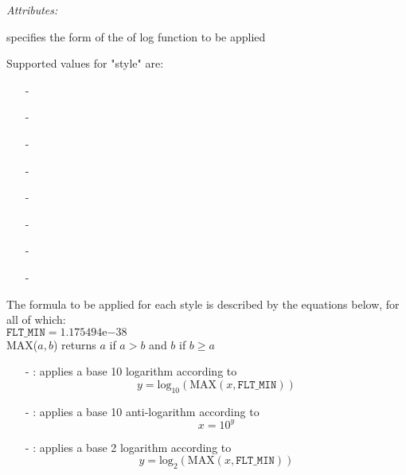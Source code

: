 \emph{Attributes:}
\begin{xmlfields}
    \xmlitem[style][required] specifies the form of the of log function to be applied \par
    Supported values for "style" are: 
        \begin{itemize}
            \item[-] 
            \item[-] 
            \item[-] 
            \item[-] 
            \item[-] 
            \item[-] 
            \item[-] 
            \item[-] 
        \end{itemize}
            
    The formula to be applied for each style is described by the equations below, for all of which: \\[6pt]
        \tabto{0.75in} $\texttt{FLT\_MIN} = 1.175494\mathrm{e}{-38}$\\[6pt]
        \tabto{0.75in} MAX(${a,b}$) returns $a$ if $a > b$ and $b$ if $b \geq a$

        \begin{itemize}
            \item[-] : applies a base 10 logarithm according to
                \begin{equation}
                    y = \text{log}_{10}(\mathrm{MAX}(x,\texttt{FLT\_MIN}))
                \end{equation}
                
            \item[-] : applies a base 10 anti-logarithm according to
                \begin{equation}
                    x = 10^{y}
                \end{equation}
                
            \item[-] : applies a base 2 logarithm according to
                \begin{equation}
                    y = \text{log}_{2}(\mathrm{MAX}(x,\texttt{FLT\_MIN}))
                \end{equation}
                

\end{itemize}
\end{xmlfields}
